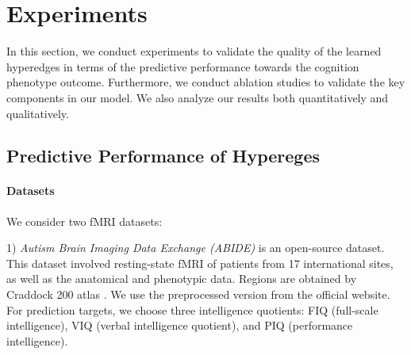 \section{Experiments}
\label{sec:hybrid-experiments}

In this section, we conduct experiments to validate the quality of the learned hyperedges in terms of the predictive performance towards the cognition phenotype outcome. Furthermore, we conduct ablation studies to validate the key components in our model. We also analyze our results both quantitatively and qualitatively.

\subsection{Predictive Performance of Hypereges}








\paragraph{Datasets}
\label{par:real_dataset}

We consider two fMRI datasets: 

1) \textit{Autism Brain Imaging Data Exchange (ABIDE)} \citep{craddock2013neuro} is an open-source dataset. This dataset involved resting-state fMRI of patients from 17 international sites, as well as the anatomical and phenotypic data. Regions are obtained by Craddock 200 atlas \citep{craddock2012whole}. We use the preprocessed version from the official website. For prediction targets, we choose three intelligence quotients: FIQ (full-scale intelligence), VIQ (verbal intelligence quotient), and PIQ (performance intelligence). 

